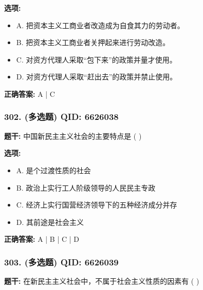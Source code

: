 \documentclass[12pt,UTF8]{ctexart}
\begin{document}
\textbf{选项:}
\begin{itemize}[leftmargin=*]

  \item A. 把资本主义工商业者改造成为自食其力的劳动者。

  \item B. 把资本主义工商业者关押起来进行劳动改造。

  \item C. 对资方代理人采取“包下来”的政策并量才使用。

  \item D. 对资方代理人采取“赶出去”的政策并禁止使用。

\end{itemize}

\textbf{正确答案:}
A | C

\vspace{0.3em}\hrulefill\vspace{0.7em}

\subsubsection*{302. (多选题) \small QID: 6626038}

\textbf{题干:}
中国新民主主义社会的主要特点是  ( )

\textbf{选项:}
\begin{itemize}[leftmargin=*]

  \item A. 是个过渡性质的社会

  \item B. 政治上实行工人阶级领导的人民民主专政

  \item C. 经济上实行国营经济领导下的五种经济成分并存

  \item D. 其前途是社会主义

\end{itemize}

\textbf{正确答案:}
A | B | C | D

\vspace{0.3em}\hrulefill\vspace{0.7em}

\subsubsection*{303. (多选题) \small QID: 6626039}

\textbf{题干:}
在新民主主义社会中，不属于社会主义性质的因素有  ( )
\end{document}
